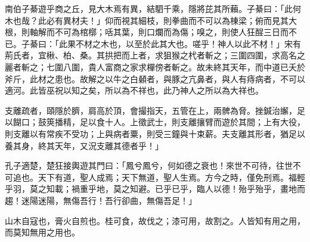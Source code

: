 \begin{pinyinscope}
南伯子綦遊乎商之丘，見大木焉有異，結駟千乘，隱將芘其所藾。子綦曰：「此何木也哉？此必有異材夫！」仰而視其細枝，則拳曲而不可以為棟梁；俯而見其大根，則軸解而不可為棺槨；咶其葉，則口爛而為傷；嗅之，則使人狂酲三日而不已。子綦曰：「此果不材之木也，以至於此其大也。嗟乎！神人以此不材！」宋有荊氏者，宜楸、柏、桑。其拱把而上者，求狙猴之杙者斬之；三圍四圍，求高名之麗者斬之；七圍八圍，貴人富商之家求樿傍者斬之。故未終其天年，而中道已夭於斧斤，此材之患也。故解之以牛之白顙者，與豚之亢鼻者，與人有痔病者，不可以適河。此皆巫祝以知之矣，所以為不祥也，此乃神人之所以為大祥也。

支離疏者，頤隱於臍，肩高於頂，會撮指天，五管在上，兩髀為脅。挫鍼治繲，足以餬口；鼓筴播精，足以食十人。上徵武士，則支離攘臂而遊於其間；上有大役，則支離以有常疾不受功；上與病者粟，則受三鐘與十束薪。夫支離其形者，猶足以養其身，終其天年，又況支離其德者乎！」

孔子適楚，楚狂接輿遊其門曰：「鳳兮鳳兮，何如德之衰也！來世不可待，往世不可追也。天下有道，聖人成焉；天下無道，聖人生焉。方今之時，僅免刑焉。福輕乎羽，莫之知載；禍重乎地，莫之知避。已乎已乎，臨人以德！殆乎殆乎，畫地而趨！迷陽迷陽，無傷吾行！吾行卻曲，無傷吾足！」

山木自寇也，膏火自煎也。桂可食，故伐之；漆可用，故割之。人皆知有用之用，而莫知無用之用也。


\end{pinyinscope}
